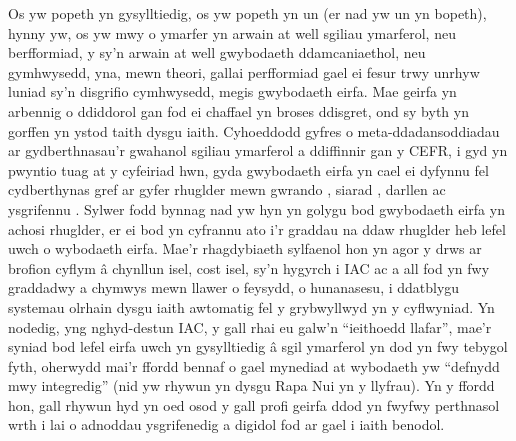 Os yw popeth yn gysylltiedig, os yw popeth yn un (er nad yw un yn bopeth), hynny yw, os yw mwy o ymarfer yn arwain at well sgiliau ymarferol, neu berfformiad, y sy'n arwain at well gwybodaeth ddamcaniaethol, neu gymhwysedd, yna, mewn theori, gallai perfformiad gael ei fesur trwy unrhyw luniad sy'n disgrifio cymhwysedd, megis gwybodaeth eirfa. Mae geirfa yn arbennig o ddiddorol gan fod ei chaffael yn broses ddisgret, ond sy byth yn gorffen yn ystod taith dysgu iaith. Cyhoeddodd \textcite{eun_hee_jeon_understanding_2022} gyfres o meta-ddadansoddiadau ar gydberthnasau'r gwahanol sgiliau ymarferol a ddiffinnir gan y CEFR, i gyd yn pwyntio tuag at y cyfeiriad hwn, gyda gwybodaeth eirfa yn cael ei dyfynnu fel cydberthynas gref ar gyfer rhuglder mewn gwrando \parencite{innami_meta-analysis_2022}, siarad \parencite{jeon_meta-analysis_2022}, darllen \parencite{jeon_updated_2022} ac ysgrifennu \parencite{kojima_meta-analysis_2022}. Sylwer fodd bynnag nad yw hyn yn golygu bod gwybodaeth eirfa yn achosi rhuglder, er ei bod yn cyfrannu ato i'r graddau na ddaw rhuglder heb lefel uwch o wybodaeth eirfa. Mae'r rhagdybiaeth sylfaenol hon yn agor y drws ar brofion cyflym â chynllun isel, cost isel, sy'n hygyrch i IAC ac a all fod yn fwy graddadwy a chymwys mewn llawer o feysydd, o hunanasesu, i ddatblygu systemau olrhain dysgu iaith awtomatig fel y grybwyllwyd yn y cyflwyniad. Yn nodedig, yng nghyd-destun IAC, y gall rhai eu galw'n ``ieithoedd llafar'', mae'r syniad bod lefel eirfa uwch yn gysylltiedig â sgil ymarferol yn dod yn fwy tebygol fyth, oherwydd mai'r ffordd bennaf o gael mynediad at wybodaeth yw ``defnydd mwy integredig'' (nid yw rhywun yn dysgu Rapa Nui yn y llyfrau). Yn y ffordd hon, gall rhywun hyd yn oed osod y gall profi geirfa ddod yn fwyfwy perthnasol wrth i lai o adnoddau ysgrifenedig a digidol fod ar gael i iaith benodol.

